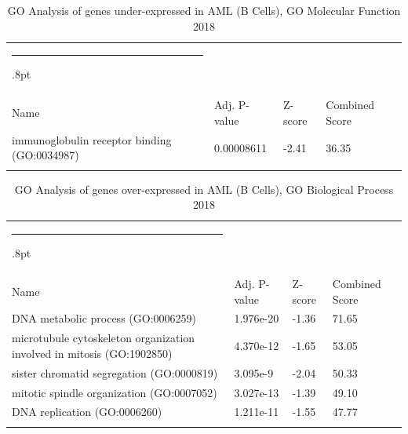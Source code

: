 \documentclass[3p,authoryear,preprint,12pt]{elsarticle}
\makeatletter
\def\hlinewd#1{%
  \noalign{\ifnum0=`}\fi\hrule \@height #1%
  \futurelet\reserved@a\@xhline}
\def\tbltoprule{\hlinewd{.8pt}\\[-12pt]}
\def\tblbottomrule{\noalign{\vspace*{6pt}}\hline\noalign{\vspace*{2pt}}}
\def\tblmidrule{\noalign{\vspace*{6pt}}\hline\noalign{\vspace*{2pt}}}
\makeatother
\begin{document}
\begin{table}[!htbp]
	\caption{{GO Analysis of genes under-expressed in AML (B Cells), GO Molecular Function 2018} }
	\label{tw-de478ae31rc6}
	\def\arraystretch{1}
	\ignorespaces 
	\centering 
	\begin{tabulary}{\linewidth}{p{\dimexpr.65\tabcolsep}p{\dimexpr.15\tabcolsep}p{\dimexpr.1\tabcolsep}p{\dimexpr.1\tabcolsep}}
		\tbltoprule Name & Adj. P-value & Z-score & Combined Score\\
		\tblmidrule
immunoglobulin receptor binding (GO:0034987) & 0.00008611 & -2.41 & 36.35 \\
		\tblbottomrule
	\end{tabulary}\par 
\end{table}
\begin{table}[!htbp]
	\caption{{GO Analysis of genes over-expressed in AML (B Cells), GO Biological Process 2018} }
	\label{tw-de478ae31sc6}
	\def\arraystretch{1}
	\ignorespaces 
	\centering 
	\begin{tabulary}{\linewidth}{p{\dimexpr.65\tabcolsep}p{\dimexpr.15\tabcolsep}p{\dimexpr.1\tabcolsep}p{\dimexpr.1\tabcolsep}}
		\tbltoprule Name & Adj. P-value & Z-score & Combined Score\\
		\tblmidrule
DNA metabolic process (GO:0006259) & 1.976e-20 & -1.36 & 71.65 \\
microtubule cytoskeleton organization involved in mitosis (GO:1902850) & 4.370e-12 & -1.65 & 53.05 \\
sister chromatid segregation (GO:0000819) & 3.095e-9 & -2.04 & 50.33 \\
mitotic spindle organization (GO:0007052) & 3.027e-13 & -1.39 & 49.10 \\
DNA replication (GO:0006260) & 1.211e-11 & -1.55 & 47.77 \\
		\tblbottomrule
	\end{tabulary}\par 
\end{table}
\end{document}
